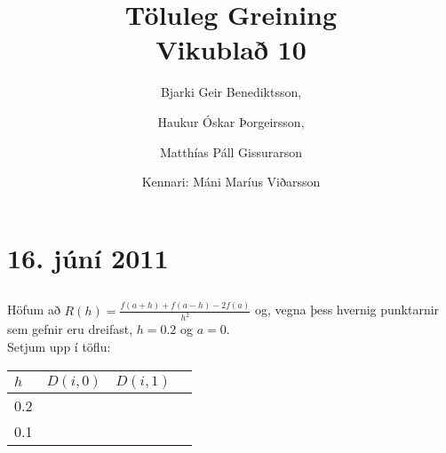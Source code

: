 \documentclass[10pt,a4paper]{article}
\begin{document}
\title{Töluleg Greining\\Vikublað 10}
\author{ 
  Bjarki Geir Benediktsson,\and
  Haukur Óskar Þorgeirsson,\and
  Matthías Páll Gissurarson \and
  Kennari: Máni Maríus Viðarsson
  }
\maketitle

\setcounter{section}{8}

\section{16. júní 2011}

\subsection{}

Höfum að $R(h) = \frac{f(a+h) + f(a-h) - 2f(a)}{h^2}$ og, vegna þess hvernig punktarnir sem gefnir eru dreifast, $h=0.2$ og $a=0$.\\

Setjum upp í töflu:

\begin{tabular}{l|lll}
$h$&$D(i,0)$&$D(i,1)$\\ \hline
0.2&\\
0.1&\\
\end{tabular}
\end{document}
